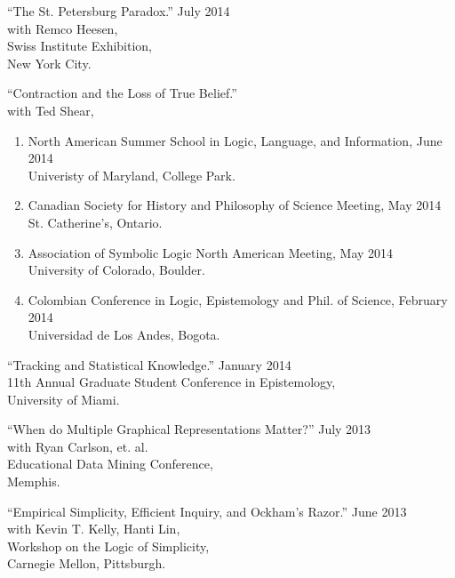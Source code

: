 \documentclass[12pt]{res} %
\begin{document}
\begin{resume}
``The St. Petersburg Paradox.'' \hfill July 2014\\
with Remco Heesen,\\
Swiss Institute Exhibition,\\ 
New York City. 


``Contraction and the Loss of True Belief.'' \\
with Ted Shear,\\
\begin{enumerate}
\item North American Summer School in Logic, Language, and Information, \hfill June 2014\\ Univeristy of Maryland, College Park. 
\item Canadian Society for History and Philosophy of Science Meeting, \hfill May 2014\\ St. Catherine's, Ontario. 
\item Association of Symbolic Logic North American Meeting, \hfill May 2014\\ University of Colorado, Boulder. 
\item Colombian Conference in Logic, Epistemology and Phil. of Science, \hfill February 2014\\ Universidad de Los Andes, Bogota. 
\end{enumerate}

``Tracking and Statistical Knowledge.'' \hfill January 2014\\
 11th Annual Graduate Student Conference in Epistemology,\\
University of Miami. 


``When do Multiple Graphical Representations Matter?'' \hfill July 2013 \\
with Ryan Carlson, et. al.\\
 Educational Data Mining Conference,\\ Memphis. 

``Empirical Simplicity, Efficient Inquiry, and Ockham's Razor.'' \hfill June 2013\\
with Kevin T. Kelly, Hanti Lin,\\
 Workshop on the Logic of Simplicity,\\
Carnegie Mellon, Pittsburgh. 




\vspace{0.2in} %


\end{resume}
\end{document}
